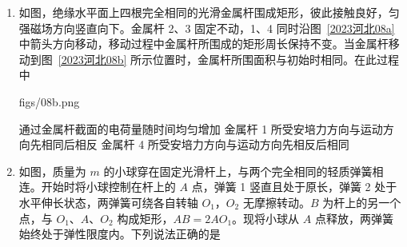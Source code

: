 \documentclass[\gkver]{gaokaozhenti}
\begin{document}
\begin{enumerate}
{$0=2mv\sin 30^\circ-2mv_{1}$

解得 $v_{1}=\frac{1}{2}v$

由于整个系统的能量守恒，设此时系统的电势能为 $E_{1}$，有

$E_{0}=E_{1}+\frac{1}{2}\cdot2mv^{2}+\frac{1}{2}\cdot2mv_{1}^{2}$

解得 $E_{1}=E_{0}-\frac{5}{4}mv^{2}$

故选 B。
}

\item
如图，绝缘水平面上四根完全相同的光滑金属杆围成矩形，彼此接触良好，匀强磁场方向竖直向下。金属杆 2、3 固定不动，1、4 同时沿图~\ref{2023河北08a} 中箭头方向移动，移动过程中金属杆所围成的矩形周长保持不变。当金属杆移动到图~\ref{2023河北08b} 所示位置时，金属杆所围面积与初始时相同。在此过程中

{figs/08b.png}

{通过金属杆截面的电荷量随时间均匀增加}
{金属杆 1 所受安培力方向与运动方向先相同后相反}
{金属杆 4 所受安培力方向与运动方向先相反后相同}


\item
如图，质量为 $m$ 的小球穿在固定光滑杆上，与两个完全相同的轻质弹簧相连。开始时将小球控制在杆上的 $A$ 点，弹簧 1 竖直且处于原长，弹簧 2 处于水平伸长状态，两弹簧可绕各自转轴 $O_{1}$，$O_{2}$ 无摩擦转动。$B$ 为杆上的另一个点，与 $O_{1}$、$A$、$O_{2}$ 构成矩形，$AB=2AO_{1}$。现将小球从 $A$ 点释放，两弹簧始终处于弹性限度内。下列说法正确的是


\end{enumerate}
\end{document}
